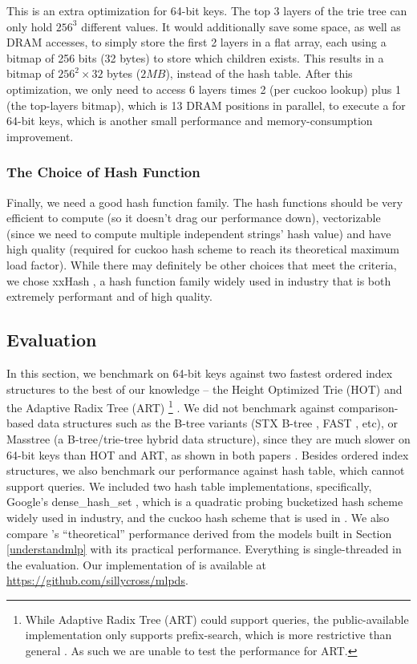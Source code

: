 \documentclass[11pt, usletter]{article}
\begin{document}
This is an extra optimization for 64-bit keys.
The top 3 layers of the trie tree can only hold $256^3$ different values. 
It would additionally save some space, as well as DRAM accesses, to simply store the first 2 layers
in a flat array, each using a bitmap of 256 bits (32 bytes) to store which children exists. 
This results in a bitmap of $256^2\times 32$ bytes ($2MB$), instead of the hash table. 
After this optimization, we only need to access 6 layers times 2 (per cuckoo lookup) plus 1 (the top-layers bitmap), 
which is 13 DRAM positions in parallel, to execute a \QueryLCP for 64-bit keys, 
which is another small performance and memory-consumption improvement.
 
\subsubsection*{The Choice of Hash Function}

Finally, we need a good hash function family.
The hash functions should be very efficient to compute (so it doesn't drag our performance down), 
vectorizable (since we need to compute multiple independent strings' hash value) 
and have high quality (required for cuckoo hash scheme to reach its theoretical maximum load factor).
While there may definitely be other choices that meet the criteria, 
we chose xxHash \cite{xxhash}, 
a hash function family widely used in industry that is both extremely performant and of high quality.

\subsection{Evaluation} \label{mlpindex_eval}

In this section, we benchmark \MlpIndex on 64-bit keys against two fastest ordered index 
structures to the best of our knowledge -- the Height Optimized Trie (HOT) \cite{hot_sigmod18} and the Adaptive Radix Tree (ART) 
\footnote{While Adaptive Radix Tree (ART) could support \lowerbound queries, 
the public-available implementation only supports prefix-search, 
which is more restrictive than general \lowerbound. 
As such we are unable to test the \lowerbound performance for ART.} \cite{arttrie_icde13}.
We did not benchmark against comparison-based data structures such as the B-tree variants 
(STX B-tree \cite{stx_btree}, FAST \cite{fast_sigmod10}, etc), 
or Masstree \cite{masstree} (a B-tree/trie-tree hybrid data structure),
since they are much slower on 64-bit keys than HOT and ART, as shown in both papers \cite{hot_sigmod18, arttrie_icde13}.
Besides ordered index structures, we also benchmark our performance against hash table, which cannot support \lowerbound queries. 
We included two hash table implementations, specifically, Google's dense\_hash\_set \cite{densehashset},
which is a quadratic probing bucketized hash scheme widely used in industry, 
and the cuckoo hash scheme that is used in \MlpIndex.
We also compare \MlpIndex's ``theoretical'' performance derived from the models built in Section \ref{understandmlp} 
with its practical performance. Everything is single-threaded in the evaluation. 
Our implementation of \MlpIndex is available at \url{https://github.com/sillycross/mlpds}.
\end{document}
